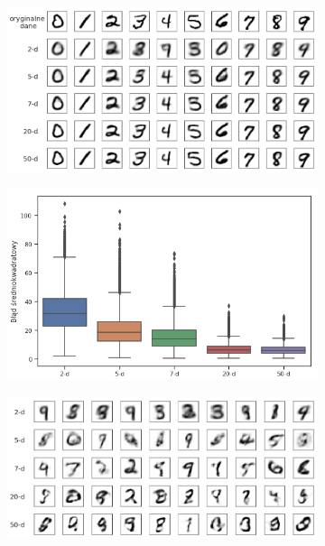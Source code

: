 \begin{figure}[h!]
  \centering
  \begin{subfigure}[b]{0.7\linewidth}
    \includegraphics[width=1.0\textwidth]{images/mnist_recon_v3}
    \caption{}
  \end{subfigure}
  \begin{subfigure}[b]{0.7\linewidth}
    \includegraphics[width=1.0\textwidth]{images/vae_mse}
    \caption{}
  \end{subfigure}
  \begin{subfigure}[b]{0.7\linewidth}
    \includegraphics[width=1.0\textwidth]{images/mnist_gen_v2}
    \caption{}
  \end{subfigure}
  \caption{}
  \label{fig:mnist_recon}
\end{figure}

